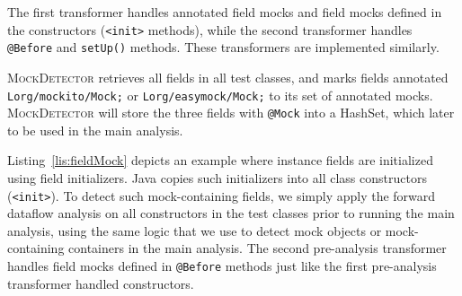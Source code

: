 The first transformer handles annotated field mocks and field mocks defined in the constructors (\texttt{<init>} methods), while the second transformer handles \texttt{@Before} and \texttt{setUp()} methods. These transformers are implemented similarly.

\textsc{MockDetector} retrieves all fields in all test classes, and marks fields annotated {\tt Lorg/mockito/Mock;} or {\tt Lorg/easymock/Mock;} to its set of annotated mocks. \textsc{MockDetector} will store the three fields with \texttt{@Mock} into a HashSet, which later to be used in the main analysis.

Listing~\ref{lis:fieldMock} depicts an example where instance fields are initialized using field initializers. Java copies such initializers into all class constructors (\texttt{<init>}). To detect such mock-containing fields, we simply apply the forward dataflow analysis on all constructors in the test classes prior to running the main analysis, using the same logic that we use to detect mock objects or mock-containing containers in the main analysis. The second pre-analysis transformer handles field mocks defined in \texttt{@Before} methods just like the first pre-analysis transformer handled constructors.



    

